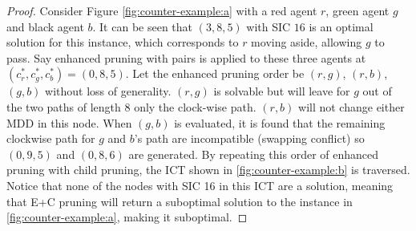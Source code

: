 \documentclass[english,10pt]{article}
\begin{document}
	\begin{proof}
		Consider Figure \ref{fig:counter-example:a} with a red agent $r$, green agent $g$ and black agent $b$. It can be seen that $(3,8,5)$ with SIC $16$ is an optimal solution for this instance, which corresponds to $r$ moving aside, allowing $g$ to pass.  Say enhanced pruning with pairs is applied to these three agents at $(c^*_r,c^*_g,c^*_b) = (0,8,5)$. Let the enhanced pruning order be $(r,g)$, $(r,b)$, $(g,b)$ without loss of generality. $(r,g)$ is solvable but will leave for $g$ out of the two paths of length $8$ only the clock-wise path. $(r,b)$ will not change either MDD in this node. When $(g,b)$ is evaluated, it is found that the remaining clockwise path for $g$ and $b$'s path are incompatible (swapping conflict) so $(0,9,5)$ and $(0,8,6)$ are generated. By repeating this order of enhanced pruning with child pruning, the ICT shown in \ref{fig:counter-example:b} is traversed. Notice that none of the nodes with SIC 16 in this ICT are a solution, meaning that E+C pruning will return a suboptimal solution to the instance in \ref{fig:counter-example:a}, making it suboptimal.
	\end{proof}
\end{document}
